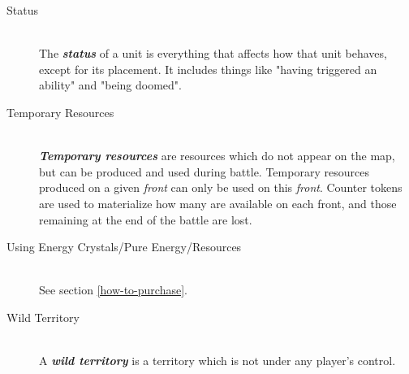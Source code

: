 \documentclass[a4paper]{article}
\begin{document}
\begin{description}
        \item[Status] \hfill \\
            The \textbf{\textit{status}} of a unit is everything that affects how
            that unit behaves, except for its placement.
            It includes things like "having triggered an ability" and "being doomed".
            
        \item[Temporary Resources] \hfill \\
            \textbf{\textit{Temporary resources}} are resources which do not appear
            on the map, but can be produced and used during battle.
            Temporary resources produced on a given \textit{front} can only be
            used on this \textit{front}.
            Counter tokens are used to materialize how many are available on each front,
            and those remaining at the end of the battle are lost.
            
        \item[Using Energy Crystals/Pure Energy/Resources] \hfill \\
            See section \ref{how-to-purchase}.
            
        \item[Wild Territory] \hfill \\
            A \textbf{\textit{wild territory}} is a territory
            which is not under any player's control.
    \end{description}
    
\end{document}
